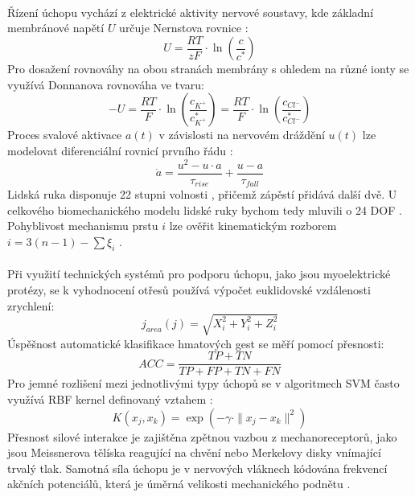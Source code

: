 \paragraph{}Řízení úchopu vychází z elektrické aktivity nervové soustavy, kde základní membránové napětí $U$ určuje Nernstova rovnice \cite{Mornstein2018}:
\begin{equation}
U = \frac{RT}{zF} \cdot \ln\left(\frac{c}{c^*}\right)
\end{equation}
Pro dosažení rovnováhy na obou stranách membrány s ohledem na různé ionty se využívá Donnanova rovnováha \cite{Mornstein2018} ve tvaru:
\begin{equation}
-U = \frac{RT}{F} \cdot \ln\left(\frac{c_{K^+}}{c_{K^+}^*}\right) = \frac{RT}{F} \cdot \ln\left(\frac{c_{Cl^-}}{c_{Cl^-}^*}\right)
\end{equation}
Proces svalové aktivace $a(t)$ v závislosti na nervovém dráždění $u(t)$ lze modelovat diferenciální rovnicí prvního řádu \cite{Capek2018}:
\begin{equation}
\dot{a} = \frac{u^2 - u \cdot a}{\tau_{rise}} + \frac{u - a}{\tau_{fall}}
\end{equation}
Lidská ruka disponuje 22 stupni volnosti \cite{Brazdil2020}, přičemž zápěstí přidává další dvě. U celkového biomechanického modelu lidské ruky bychom tedy mluvili o 24 DOF \cite{Hansen2018}. Pohyblivost mechanismu prstu $i$ lze ověřit kinematickým rozborem $i = 3(n - 1) - \sum \xi_i$ \cite{Safran2022}.

\paragraph{}Při využití technických systémů pro podporu úchopu, jako jsou myoelektrické protézy, se k vyhodnocení otřesů používá výpočet euklidovské vzdálenosti zrychlení:
\begin{equation}
j_{area}(j) = \sqrt{X_i^2 + Y_i^2 + Z_i^2}
\end{equation}
Úspěšnost automatické klasifikace hmatových gest se měří pomocí přesnosti:
\begin{equation}
ACC = \frac{TP + TN}{TP + FP + TN + FN}
\end{equation}
Pro jemné rozlišení mezi jednotlivými typy úchopů se v algoritmech SVM často využívá RBF kernel definovaný vztahem \cite{Brazdil2020}:
\begin{equation}
K(x_j, x_k) = \exp(-\gamma \cdot \|x_j - x_k\|^2)
\end{equation}
Přesnost silové interakce je zajištěna zpětnou vazbou z mechanoreceptorů, jako jsou Meissnerova tělíska reagující na chvění nebo Merkelovy disky vnímající trvalý tlak. Samotná síla úchopu je v nervových vláknech kódována frekvencí akčních potenciálů, která je úměrná velikosti mechanického podnětu \cite{Stuchla2024}.


